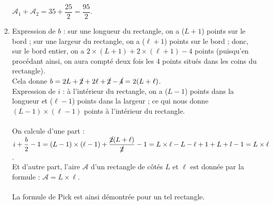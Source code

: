 \begin{enumerate}
   $\mathcal{A}_1+\mathcal{A}_2 =35+\dfrac{25}{2} =\dfrac{95}{2}.$ \\ [1mm]
   \item Expression de $b$ : sur une longueur du rectangle, on a ($L+1$) points sur le bord ; sur une largeur du rectangle, on a ($\ell+1$) points sur le bord ; donc, sur le bord entier, on a $2\times(L+1)+2\times(\ell+1)-4$ points (puisqu'en procédant ainsi, on aura compté deux fois les 4 points situés dans les coins du rectangle). \\
   Cela donne $b =2L+\cancel{2}+2\ell+\cancel{2}-\cancel{4}=2(L+\ell)$. \\
   Expression de $i$ : à l'intérieur du rectangle, on a ($L-1$) points dans la longueur et ($\ell-1$) points dans la largeur ; ce qui nous donne $(L-1)\times(\ell-1)$ points à l'intérieur du rectangle. \\
    \\
   On calcule d'une part : $i+\dfrac{b}{2}-1 =(L-1)\times(\ell-1)+\dfrac{\cancel{2}(L+\ell)}{\cancel{2}}-1 =L\times\ell-L-\ell+1+L+l-1 =L\times\ell$. \\ [1mm]
   Et d'autre part, l'aire $\mathcal{A}$ d'un rectangle de côtés $L$ et $\ell$ est donnée par la formule : $\mathcal{A} =L\times\ell$. \\
    \\
   La formule de Pick est ainsi démontrée pour un tel rectangle.
\end{enumerate}
